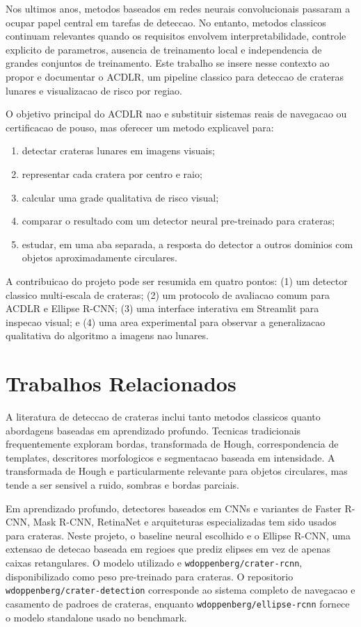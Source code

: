 \documentclass[12pt,a4paper]{article}
\begin{document}
Nos ultimos anos, metodos baseados em redes neurais convolucionais passaram a ocupar papel central em tarefas de deteccao. No entanto, metodos classicos continuam relevantes quando os requisitos envolvem interpretabilidade, controle explicito de parametros, ausencia de treinamento local e independencia de grandes conjuntos de treinamento. Este trabalho se insere nesse contexto ao propor e documentar o ACDLR, um pipeline classico para deteccao de crateras lunares e visualizacao de risco por regiao.

O objetivo principal do ACDLR nao e substituir sistemas reais de navegacao ou certificacao de pouso, mas oferecer um metodo explicavel para:

\begin{enumerate}[label=(\roman*)]
    \item detectar crateras lunares em imagens visuais;
    \item representar cada cratera por centro e raio;
    \item calcular uma grade qualitativa de risco visual;
    \item comparar o resultado com um detector neural pre-treinado para crateras;
    \item estudar, em uma aba separada, a resposta do detector a outros dominios com objetos aproximadamente circulares.
\end{enumerate}

A contribuicao do projeto pode ser resumida em quatro pontos: (1) um detector classico multi-escala de crateras; (2) um protocolo de avaliacao comum para ACDLR e Ellipse R-CNN; (3) uma interface interativa em Streamlit para inspecao visual; e (4) uma area experimental para observar a generalizacao qualitativa do algoritmo a imagens nao lunares.

\section{Trabalhos Relacionados}

A literatura de deteccao de crateras inclui tanto metodos classicos quanto abordagens baseadas em aprendizado profundo. Tecnicas tradicionais frequentemente exploram bordas, transformada de Hough, correspondencia de templates, descritores morfologicos e segmentacao baseada em intensidade. A transformada de Hough e particularmente relevante para objetos circulares, mas tende a ser sensivel a ruido, sombras e bordas parciais.

Em aprendizado profundo, detectores baseados em CNNs e variantes de Faster R-CNN, Mask R-CNN, RetinaNet e arquiteturas especializadas tem sido usados para crateras. Neste projeto, o baseline neural escolhido e o Ellipse R-CNN, uma extensao de detecao baseada em regioes que prediz elipses em vez de apenas caixas retangulares. O modelo utilizado e \texttt{wdoppenberg/crater-rcnn}, disponibilizado como peso pre-treinado para crateras. O repositorio \texttt{wdoppenberg/crater-detection} corresponde ao sistema completo de navegacao e casamento de padroes de crateras, enquanto \texttt{wdoppenberg/ellipse-rcnn} fornece o modelo standalone usado no benchmark.
\end{document}
